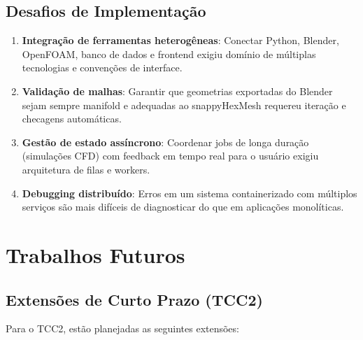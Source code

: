 \subsection{Desafios de Implementação}

\begin{enumerate}
    \item \textbf{Integração de ferramentas heterogêneas}: Conectar Python, Blender, OpenFOAM, banco de dados e frontend exigiu domínio de múltiplas tecnologias e convenções de interface.
    
    \item \textbf{Validação de malhas}: Garantir que geometrias exportadas do Blender sejam sempre manifold e adequadas ao snappyHexMesh requereu iteração e checagens automáticas.
    
    \item \textbf{Gestão de estado assíncrono}: Coordenar jobs de longa duração (simulações CFD) com feedback em tempo real para o usuário exigiu arquitetura de filas e workers.
    
    \item \textbf{Debugging distribuído}: Erros em um sistema containerizado com múltiplos serviços são mais difíceis de diagnosticar do que em aplicações monolíticas.
\end{enumerate}

\section{Trabalhos Futuros}

\subsection{Extensões de Curto Prazo (TCC2)}

Para o TCC2, estão planejadas as seguintes extensões:

